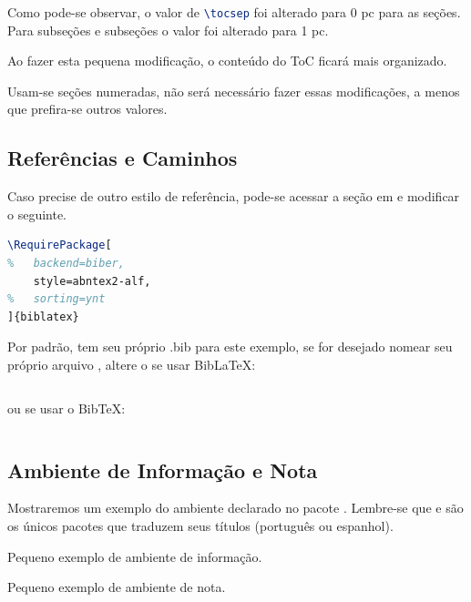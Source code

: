 \documentclass[12pt,a4paper,oneside,linenumbers=off,latinmodern=off,timesnews=off,spanish,english,portuges]{rctart-class/rctart}
\begin{document}
        Como pode-se observar, o valor de \lstinline[language=TeX]|\tocsep| foi alterado para 0 pc para as seções. Para subseções e subseções o valor foi alterado para 1 pc.

        Ao fazer esta pequena modificação, o conteúdo do ToC ficará mais organizado.

        Usam-se seções numeradas, não será necessário fazer essas modificações, a menos que prefira-se outros valores.

    \subsection{Referências e Caminhos}

        Caso precise de outro estilo de referência, pode-se acessar a seção  em  e modificar o seguinte.

\nolinenumbers
\begin{lstlisting}[language=TeX, caption=Estilo de referência.]
\RequirePackage[
% 	backend=biber,
	style=abntex2-alf,
% 	sorting=ynt
]{biblatex}
\end{lstlisting}
\linenumbers

        Por padrão,  tem seu próprio .bib para este exemplo, se for desejado nomear seu próprio arquivo , altere o  se usar Bib\LaTeX:		
\nolinenumbers
\begin{lstlisting}[language=TeX]

\end{lstlisting}
\linenumbers
ou se usar o Bib\TeX:
\nolinenumbers
\begin{lstlisting}[language=TeX]

\end{lstlisting}
\linenumbers

  \subsection{Ambiente de Informação e Nota}

        Mostraremos um exemplo do ambiente  declarado no pacote . Lembre-se que  e  são os únicos pacotes que traduzem seus títulos (português ou espanhol).

        \begin{info}
            Pequeno exemplo de ambiente de informação.
        \end{info}
        \begin{note}
            Pequeno exemplo de ambiente de nota.
        \end{note}
        
\end{document}
